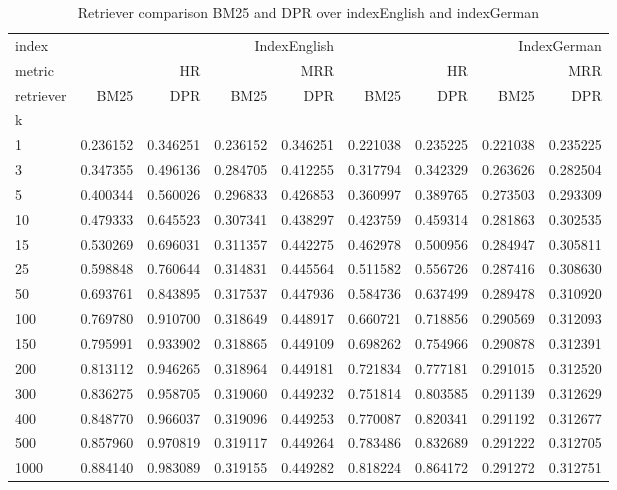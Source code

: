 \begin{table}
    \centering    
    \begin{tabular}{lrrrrrrrr}
    \toprule
    index & \multicolumn{4}{r}{IndexEnglish} & \multicolumn{4}{r}{IndexGerman} \\
    metric & \multicolumn{2}{r}{HR} & \multicolumn{2}{r}{MRR} & \multicolumn{2}{r}{HR} & \multicolumn{2}{r}{MRR} \\
    retriever & BM25 & DPR & BM25 & DPR & BM25 & DPR & BM25 & DPR \\
    k &  &  &  &  &  &  &  &  \\
    \midrule
    1 & 0.236152 & 0.346251 & 0.236152 & 0.346251 & 0.221038 & 0.235225 & 0.221038 & 0.235225 \\
    3 & 0.347355 & 0.496136 & 0.284705 & 0.412255 & 0.317794 & 0.342329 & 0.263626 & 0.282504 \\
    5 & 0.400344 & 0.560026 & 0.296833 & 0.426853 & 0.360997 & 0.389765 & 0.273503 & 0.293309 \\
    10 & 0.479333 & 0.645523 & 0.307341 & 0.438297 & 0.423759 & 0.459314 & 0.281863 & 0.302535 \\
    15 & 0.530269 & 0.696031 & 0.311357 & 0.442275 & 0.462978 & 0.500956 & 0.284947 & 0.305811 \\
    25 & 0.598848 & 0.760644 & 0.314831 & 0.445564 & 0.511582 & 0.556726 & 0.287416 & 0.308630 \\
    50 & 0.693761 & 0.843895 & 0.317537 & 0.447936 & 0.584736 & 0.637499 & 0.289478 & 0.310920 \\
    100 & 0.769780 & 0.910700 & 0.318649 & 0.448917 & 0.660721 & 0.718856 & 0.290569 & 0.312093 \\
    150 & 0.795991 & 0.933902 & 0.318865 & 0.449109 & 0.698262 & 0.754966 & 0.290878 & 0.312391 \\
    200 & 0.813112 & 0.946265 & 0.318964 & 0.449181 & 0.721834 & 0.777181 & 0.291015 & 0.312520 \\
    300 & 0.836275 & 0.958705 & 0.319060 & 0.449232 & 0.751814 & 0.803585 & 0.291139 & 0.312629 \\
    400 & 0.848770 & 0.966037 & 0.319096 & 0.449253 & 0.770087 & 0.820341 & 0.291192 & 0.312677 \\
    500 & 0.857960 & 0.970819 & 0.319117 & 0.449264 & 0.783486 & 0.832689 & 0.291222 & 0.312705 \\
    1000 & 0.884140 & 0.983089 & 0.319155 & 0.449282 & 0.818224 & 0.864172 & 0.291272 & 0.312751 \\
    \bottomrule
    \end{tabular}
    \caption{Retriever comparison BM25 and DPR over indexEnglish and indexGerman}
\end{table}

